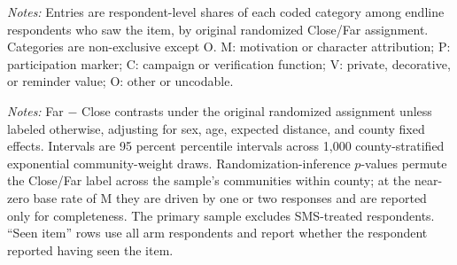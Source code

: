 \documentclass[12pt]{article}
\begin{document}
\begin{table}[htbp]
  \centering
  \small
  \caption{Coded meaning content by item and original distance assignment}
  \label{tab:signal-meaning-shares}
  \begin{threeparttable}
    
    \begin{tablenotes}[flushleft]\footnotesize
      \item \textit{Notes:} Entries are respondent-level shares of each coded
      category among endline respondents who saw the item, by original
      randomized Close/Far assignment. Categories are non-exclusive except O.
      M: motivation or character attribution; P: participation marker; C:
      campaign or verification function; V: private, decorative, or reminder
      value; O: other or uncodable.
    \end{tablenotes}
  \end{threeparttable}
\end{table}

\begin{table}[htbp]
  \centering
  \small
  \caption{Distance contrasts in coded meaning content and item exposure}
  \label{tab:signal-meaning-effects}
  \resizebox{\linewidth}{!}{%
    }
  \begin{minipage}{0.96\linewidth}
    \vspace{0.35em}\footnotesize
    \textit{Notes:} Far $-$ Close contrasts under the original randomized
    assignment unless labeled otherwise, adjusting for sex, age, expected
    distance, and county fixed effects. Intervals are 95 percent percentile
    intervals across 1{,}000 county-stratified exponential community-weight
    draws. Randomization-inference $p$-values permute the Close/Far label
    across the sample's communities within county; at the near-zero base rate
    of M they are driven by one or two responses and are reported only for
    completeness. The primary sample excludes SMS-treated respondents. ``Seen
    item'' rows use all arm respondents and report whether the respondent
    reported having seen the item.
  \end{minipage}
\end{table}

\begin{table}[htbp]
  \centering
  \small
  \caption{Most common coded examples (bracelet arm)}
  \label{tab:signal-meaning-quotes}
  
\end{table}
\end{document}
